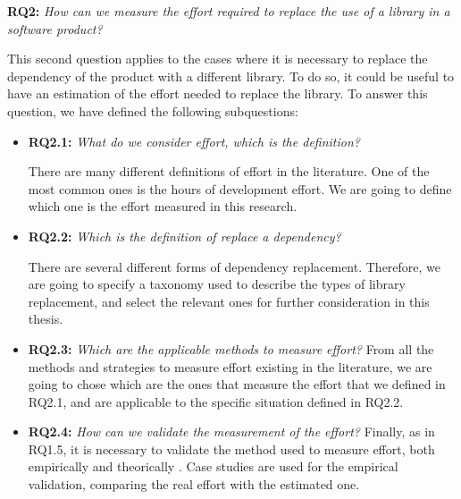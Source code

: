 \blankl
\textbf{RQ2:} \textit{How can we measure the effort required to replace the use of a library in a software product?}

This second question applies to the cases where it is necessary to replace the dependency of the product with a different library. To do so, it could be useful to have an estimation of the effort needed to replace the library. To answer this question, we have defined the following subquestions:

\begin{itemize}
  \item \textbf{RQ2.1:} \textit{What do we consider effort, which is the definition?}

  There are many different definitions of effort in the literature. One of the most common ones is the hours of development effort. We are going to define which one is the effort measured in this research. 

  \item \textbf{RQ2.2:} \textit{Which is the definition of replace a dependency?}

  There are several different forms of dependency replacement. Therefore, we are going to specify a taxonomy used to describe the types of library replacement, and select the relevant ones for further consideration in this thesis.

  \item \textbf{RQ2.3:} \textit{Which are the applicable methods to measure effort?}
  From all the methods and strategies to measure effort existing in the literature, we are going to chose which are the ones that measure the effort that we defined in RQ2.1, and are applicable to the specific situation defined in RQ2.2.

  \item \textbf{RQ2.4:} \textit{How can we validate the measurement of the effort?}
  Finally, as in RQ1.5, it is necessary to validate the method used to measure effort, both empirically and theorically . Case studies are used for the empirical validation, comparing the real effort with the estimated one.
\end{itemize}

